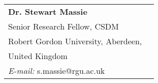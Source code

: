 \documentclass[margin,line]{res}
\begin{document}
\begin{resume}
\vspace{-.1in}
\begin{tabular}{@{}p{3in}p{3in}}
{\bf Dr. Stewart Massie}\\
Senior Research Fellow, CSDM \\
Robert Gordon University, Aberdeen, \\
United Kingdom \\
{\it E-mail:} s.massie@rgu.ac.uk
\end{tabular}

\end{resume}
\end{document}
